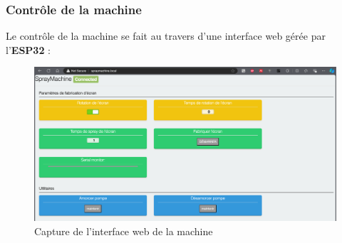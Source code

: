 \newpage
\subsubsection{Contrôle de la machine}
Le contrôle de la machine se fait au travers d'une interface web gérée par l'\textbf{ESP32} :
\begin{figure}[H]
    \centering
    \includegraphics[width = \textwidth]{assets/figures/ameliorations/Inteface_web.png}
    \caption{Capture de l'interface web de la machine}
\end{figure}
